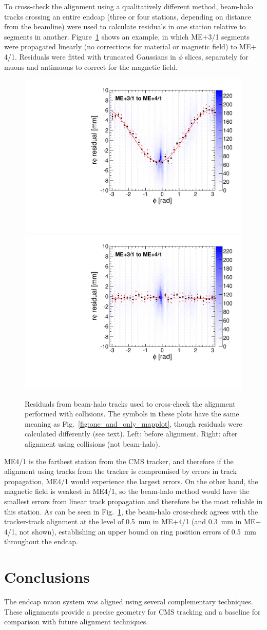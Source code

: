 \documentclass[12pt]{article}
\begin{document}
To cross-check the alignment using a qualitatively different method,
beam-halo tracks crossing an entire endcap (three or four stations,
depending on distance from the beamline) were used to calculate
residuals in one station relative to segments in another.
Figure~\ref{fig:BHCrossCheck_mep41} shows an example, in which
ME$+$3/1 segments were propagated linearly (no corrections for
material or magnetic field) to ME$+$4/1.  Residuals were fitted with
truncated Gaussians in $\phi$ slices, separately for muons and
antimuons to correct for the magnetic field.

\begin{figure}
\includegraphics[width=0.45\linewidth]{BHCrossCheck_mep41_before.pdf} \hfill
\includegraphics[width=0.45\linewidth]{BHCrossCheck_mep41_after.pdf}

\caption{Residuals from beam-halo tracks used to cross-check the
  alignment performed with collisions.  The symbols in these plots
  have the same meaning as Fig.~\ref{fig:one_and_only_mapplot}, though
  residuals were calculated differently (see text).  Left: before
  alignment.  Right: after alignment using collisions (not
  beam-halo).  \label{fig:BHCrossCheck_mep41}}
\end{figure}

ME4/1 is the farthest station from the CMS tracker, and therefore if
the alignment using tracks from the tracker is compromised by errors
in track propagation, ME4/1 would experience the largest errors.  On
the other hand, the magnetic field is weakest in ME4/1, so the
beam-halo method would have the smallest errors from linear track
propagation and therefore be the most reliable in this station.  As
can be seen in Fig.~\ref{fig:BHCrossCheck_mep41}, the beam-halo
cross-check agrees with the tracker-track alignment at the level of
0.5~mm in ME$+$4/1 (and 0.3~mm in ME$-$4/1, not shown), establishing
an upper bound on ring position errors of 0.5~mm throughout the
endcap.

\section{Conclusions}

The endcap muon system was aligned using several complementary
techniques.  These alignments provide a precise geometry for CMS
tracking and a baseline for comparison with future alignment
techniques.
\end{document}
